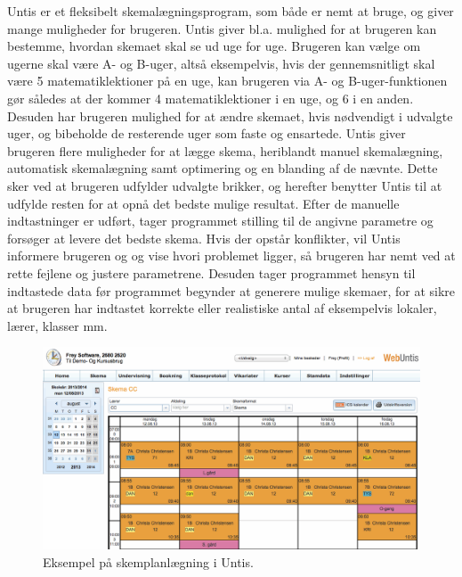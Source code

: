 Untis er et fleksibelt skemalægningsprogram, som både er nemt at bruge, og giver mange muligheder for brugeren. Untis giver bl.a. mulighed for at brugeren kan bestemme, hvordan skemaet skal se ud uge for uge. Brugeren kan vælge om ugerne skal være A- og B-uger, altså eksempelvis, hvis der gennemsnitligt skal være 5 matematiklektioner på en uge, kan brugeren via A- og B-uger-funktionen gør således at der kommer 4 matematiklektioner i en uge, og 6 i en anden. Desuden har brugeren mulighed for at ændre skemaet, hvis nødvendigt i udvalgte uger, og bibeholde de resterende uger som faste og ensartede. 
Untis giver brugeren flere muligheder for at lægge skema, heriblandt manuel skemalægning, automatisk skemalægning samt optimering og en blanding af de nævnte. Dette sker ved at brugeren udfylder udvalgte brikker, og herefter benytter Untis til at udfylde resten for at opnå det bedste mulige resultat. Efter de manuelle indtastninger er udført, tager programmet stilling til de angivne parametre og forsøger at levere det bedste skema. Hvis der opstår konflikter, vil Untis informere brugeren og og vise hvori problemet ligger, så brugeren har nemt ved at rette fejlene og justere parametrene. Desuden tager programmet hensyn til indtastede data før programmet begynder at generere mulige skemaer, for at sikre at brugeren har indtastet korrekte eller realistiske antal af eksempelvis lokaler, lærer, klasser mm\cite{untis2016}.
\begin{figure}[!h]
  \centering
  \includegraphics[width=\textwidth]{partials/graphics/untis.png}
  \caption{Eksempel på skemplanlægning i Untis\cite{untisb}.}
  \label{fig:untis}
\end{figure}
